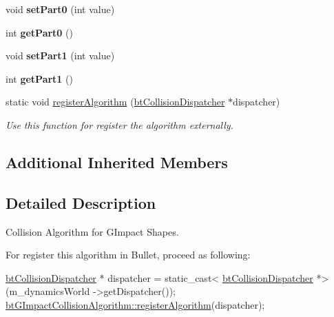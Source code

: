 \begin{DoxyCompactItemize}
\item 
\hypertarget{classbt_g_impact_collision_algorithm_aa162a549af997e98fed7f28bd04c67e9}{void {\bfseries set\+Part0} (int value)}\label{classbt_g_impact_collision_algorithm_aa162a549af997e98fed7f28bd04c67e9}

\item 
\hypertarget{classbt_g_impact_collision_algorithm_a34208b0e64fb1059eac428fb19380329}{int {\bfseries get\+Part0} ()}\label{classbt_g_impact_collision_algorithm_a34208b0e64fb1059eac428fb19380329}

\item 
\hypertarget{classbt_g_impact_collision_algorithm_a8331035e2532a2380fb9852e130fa72e}{void {\bfseries set\+Part1} (int value)}\label{classbt_g_impact_collision_algorithm_a8331035e2532a2380fb9852e130fa72e}

\item 
\hypertarget{classbt_g_impact_collision_algorithm_aed04922dcbc9e78ab2af970628037684}{int {\bfseries get\+Part1} ()}\label{classbt_g_impact_collision_algorithm_aed04922dcbc9e78ab2af970628037684}

\item 
\hypertarget{classbt_g_impact_collision_algorithm_a8ddef653ddc1afa7c976abb1ecaf0b98}{static void \hyperlink{classbt_g_impact_collision_algorithm_a8ddef653ddc1afa7c976abb1ecaf0b98}{register\+Algorithm} (\hyperlink{classbt_collision_dispatcher}{bt\+Collision\+Dispatcher} $\ast$dispatcher)}\label{classbt_g_impact_collision_algorithm_a8ddef653ddc1afa7c976abb1ecaf0b98}

\begin{DoxyCompactList}\small\item\em Use this function for register the algorithm externally. \end{DoxyCompactList}\end{DoxyCompactItemize}
\subsection*{Additional Inherited Members}


\subsection{Detailed Description}
Collision Algorithm for G\+Impact Shapes. 

For register this algorithm in Bullet, proceed as following\+: 
\begin{DoxyCode}
\hyperlink{classbt_collision_dispatcher}{btCollisionDispatcher} * dispatcher = \textcolor{keyword}{static\_cast<}
      \hyperlink{classbt_collision_dispatcher}{btCollisionDispatcher} *\textcolor{keyword}{>}(m\_dynamicsWorld ->getDispatcher());
\hyperlink{classbt_g_impact_collision_algorithm_a8ddef653ddc1afa7c976abb1ecaf0b98}{btGImpactCollisionAlgorithm::registerAlgorithm}(dispatcher);
\end{DoxyCode}
 


